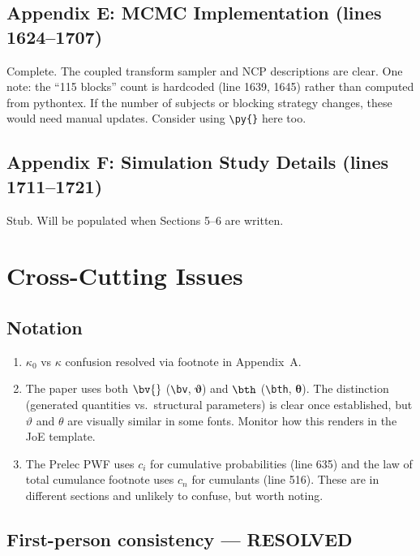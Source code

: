 \documentclass[12pt,a4paper]{article}
\begin{document}
\subsection{Appendix E: MCMC Implementation (lines 1624--1707)}

Complete. The coupled transform sampler and NCP descriptions are clear. One
note: the ``115 blocks'' count is hardcoded (line 1639, 1645) rather than
computed from pythontex. If the number of subjects or blocking strategy changes,
these would need manual updates. Consider using \verb|\py{}| here too.

\subsection{Appendix F: Simulation Study Details (lines 1711--1721)}

Stub. Will be populated when Sections 5--6 are written.


\section{Cross-Cutting Issues}

\subsection{Notation}

\begin{enumerate}[label=(\alph*)]
  \item[{[x]}] $\kappa_0$ vs $\kappa$ confusion resolved via footnote in
    Appendix~A.
  \item The paper uses both $\bv{}$ (\verb|\bv|, $\boldsymbol{\vartheta}$) and
    $\bth$ (\verb|\bth|, $\boldsymbol{\theta}$). The distinction (generated
    quantities vs.\ structural parameters) is clear once established, but
    $\vartheta$ and $\theta$ are visually similar in some fonts. Monitor how
    this renders in the JoE template.
  \item The Prelec PWF uses $c_i$ for cumulative probabilities (line 635) and
    the law of total cumulance footnote uses $c_n$ for cumulants (line 516).
    These are in different sections and unlikely to confuse, but worth noting.
\end{enumerate}

\subsection{First-person consistency --- RESOLVED}
\end{document}
